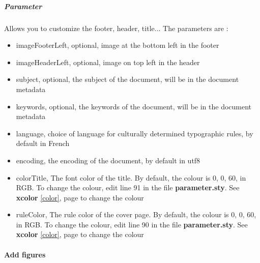 \subparagraph{Parameter}
Allows you to customize the footer, header, title...
The parameters are :
\begin{itemize}
    \item imageFooterLeft, optional, image at the bottom left in the footer
    \item imageHeaderLeft, optional, image on top left in the header
    \item subject, optional, the subject of the document, will be in the document metadata
    \item keywords, optional, the keywords of the document, will be in the document metadata
    \item language, choice of language for culturally determined typographic rules, by default in
          French \label{language}
    \item encoding, the encoding of the document, by default in utf8
    \item colorTitle, The font color of the title. By default, the colour is 0, 0, 60, in RGB. To
          change the colour, edit line 91 in the file \textbf{parameter.sty}. See \textbf{xcolor}
          \ref{color}, page \pageref{color} to change the colour
    \item ruleColor, The rule color of the cover page. By default, the colour is 0, 0, 60, in RGB.
          To change the colour, edit line 90 in the file \textbf{parameter.sty}. See \textbf{xcolor}
          \ref{color}, page \pageref{color} to change the colour
\end{itemize}

\paragraph{Add figures}


